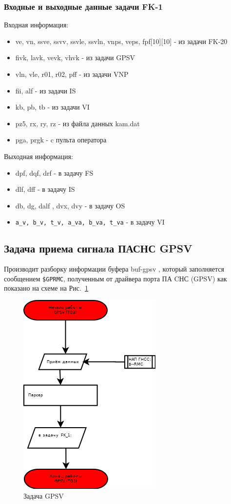\subsubsection{Входные и выходные данные задачи FK-1}
Входная информация:
\begin{itemize}
\item ve, vn, ssve, ssvv, ssvle, ssvln, vnps, veps, fpf[10][10] - из задачи   FK-20
\item fivk, lavk, vevk, vhvk - из задачи   GPSV
\item vln, vle, r01, r02, pff - из задачи VNP
\item fii, alf - из  задачи  IS
\item kb, pb, tb - из задачи VI
\item pz5, rx, ry, rz - из файла данных kam.dat
\item  pga, prgk  - c пульта оператора
\end{itemize}
Выходная информация:
\begin{itemize}
    \item dpf, dqf, drf - в задачу  FS
    \item dlf, dff - в задачу  IS
    \item db, dg, dalf , dvx, dvy - в задачу OS
    \item \verb|a_v, b_v, t_v, a_va, b_va, t_va| - в задачу  VI
\end{itemize}
\subsection{Задача приема сигнала ПАСНС GPSV}
Производит  разборку информации  буфера  buf-gpsv , который заполняется сообщением \verb|$GPRMC|, 
полученным от  драйвера  порта  ПА CНС (GPSV) как показано на схеме на Рис.~\ref{fig:GPSV}
\begin{figure}[H]
    \centering
    \includegraphics[width=0.75\linewidth]{images/GPSV.png}
    \caption{Задача GPSV}
    \label{fig:GPSV}
\end{figure}
